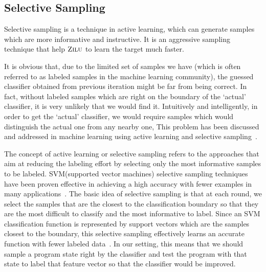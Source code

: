 \subsection{Selective Sampling}
Selective sampling is a technique in active learning, which can generate samples which are more informative and instructive.
It is an aggressive sampling technique that help $\textsc{Zilu}$ to learn the target much faster.

It is obvious that, due to the limited set of samples we have (which is often referred to as labeled samples in the machine learning community), 
the guessed classifier obtained from previous iteration might be far from being correct. 
In fact, without labeled samples which are right on the boundary of the `actual' classifier, 
it is very unlikely that we would find it. 
Intuitively and intelligently, in order to get the `actual' classifier, 
we would require samples which would distinguish the actual one from any nearby one, 
This problem has been discussed and addressed in machine learning using active learning and selective sampling~\cite{DBLP:conf/icml/SchohnC00}.

The concept of active learning or selective sampling refers to the approaches 
that aim at reducing the labeling effort by selecting only the most informative samples to be labeled. 
SVM(supported vector machines) selective sampling techniques have been proven effective in achieving a high accuracy 
with fewer examples in many applications~\cite{DBLP:conf/mm/TongC01,DBLP:journals/jmlr/TongK01}. 
The basic idea of selective sampling is that at each round, we select the samples that are the closest to the classification boundary 
so that they are the most difficult to classify and the most informative to label. 
Since an SVM classification function is represented by support vectors which are the samples closest to the boundary, 
this selective sampling effectively learns an accurate function with fewer labeled data~\cite{DBLP:conf/icml/SchohnC00}. 
In our setting, this means that we should sample a program state right by the classifier and test the program 
with that state to label that feature vector so that the classifier would be improved.


